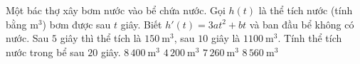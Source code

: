 \begin{ex}%
	Một bác thợ xây bơm nước vào bể chứa nước. Gọi $h(t)$ là thể tích  nước (tính bằng $\mathrm{m^3}$) bơm được sau $t$ giây. Biết $h'(t) = 3a t^2 + bt$ và ban đầu bể không có nước. Sau $5$ giây thì thể tích là $150~\mathrm{m^3}$, sau $10$ giây là $1100~\mathrm{m^3}$. Tính thể tích nước trong bể sau $20$ giây.
	\choice 
		{\True $8\,400~\mathrm{m^3}$} 
		 {$4\,200~\mathrm{m^3}$}
		 {$7\,260~\mathrm{m^3}$}
		{$8\,560~\mathrm{m^3}$} 
\end{ex}

